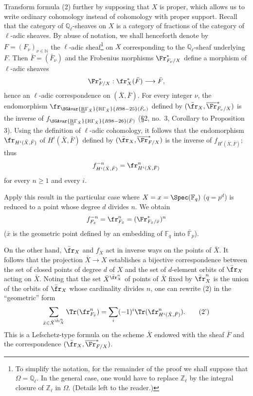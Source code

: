Transform formula (2) further by supposing that $X$ is proper, which
allows us to write ordinary cohomology instead of cohomology with
proper support. Recall that the category of $\mathbb Q_\ell$-sheaves
on $X$ is a category of fractions of the category of $\ell$-adic
sheaves. By abuse of notation, we shall henceforth denote by
$F=(F_\nu)_{\nu\in\mathbb N}$ the $\ell$-adic
sheaf\footnote{To simplify the notation, for the remainder of the
proof we shall suppose that $\Omega=\mathbb Q_\ell$. In the general
case, one would have to replace $\mathbb Z_\ell$ by the integral closure
of $\mathbb Z_\ell$ in $\Omega$. (Details left to the reader.)}
on $X$ corresponding to the $\mathbb Q_\ell$-sheaf underlying $F$.
Then $\bar F=(\bar F_\nu)$ and the Frobenius morphisms
$\Fr^*_{F_\nu/X}$ define a morphism of $\ell$-adic sheaves
\[
\Fr^*_{F/X}:
\fr_X^*(\bar F)\longrightarrow\bar F,
\]
hence an $\ell$-adic correspondence on $(\bar X,\bar F)$. For every
integer $\nu$, the endomorphism
$\fr_{\SGAvar{\underline{\underline{\mathrm{R}}}\Gamma_{\bar X}}{\mathrm{R}\Gamma_{\bar X}}{R98-25}(\bar F_\nu)}$ defined by
$(\bar{\fr}_X,\overline{\Fr}^*_{F_\nu/X})$ is the inverse of
$f_{\SGAvar{\underline{\underline{\mathrm{R}}}\Gamma_{\bar X}}{\mathrm{R}\Gamma_{\bar X}}{R98-26}(\bar F)}$ (§2, no.~3, Corollary to Proposition 3).
Using the definition of $\ell$-adic cohomology, it follows that the
endomorphism $\fr_{H^i(\bar X,\bar F)}$ of $H^i(\bar X,\bar F)$
defined by $(\bar{\fr}_X,\overline{\Fr}^*_{F/X})$ is the inverse of
$f_{H^i(\bar X,\bar F)}$; thus
\[
f^{-n}_{H^i(\bar X,\bar F)}
=\fr^n_{H^i(\bar X,\bar F)}
\]
for every $n\ge1$ and every $i$.

Apply this result in the particular case where $X=x=\Spec(\mathbb F_q)$ ($q=p^d$) is reduced to a point whose degree $d$ divides $n$. We obtain
\[
f^{-n}_{F_{\bar x}}=\fr^n_{F_{\bar x}}=(\Fr^*_{F_{\bar x}/\bar x})^n
\]
($\bar x$ is the geometric point defined by an embedding of $\mathbb F_q$ into $\bar{\mathbb F}_p$).

On the other hand, $\bar{\fr}_X$ and $f_X$ act in inverse ways on the points of $\bar X$. It follows that the projection $\bar X\to X$ establishes a bijective correspondence between the set of closed points of degree $d$ of $X$ and the set of $d$-element orbits of $\bar{\fr}_X$ acting on $\bar X$. Noting that the set $\bar X^{\bar{\fr}_X^n}$ of points of $\bar X$ fixed by $\bar{\fr}_X^n$ is the union of the orbits of $\bar{\fr}_X$ whose cardinality divides $n$, one can rewrite (2) in the ``geometric'' form
\[
\sum_{\bar x\in\bar X^{\bar{\fr}_X^n}}\Tr(\fr^n_{F_{\bar x}})
=\sum_i(-1)^i\Tr(\fr^n_{H^i(\bar X,\bar F)}).
\tag{2'}
\]
This is a Lefschetz-type formula on the scheme $\bar X$ endowed with the sheaf $\bar F$ and the correspondence $(\bar{\fr}_X,\overline{\Fr}^*_{F/X})$.

